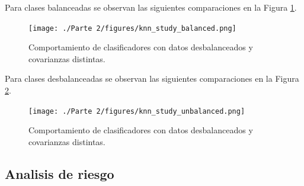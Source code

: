\documentclass[10pt]{article}
\begin{document}
Para clases balanceadas se observan las siguientes comparaciones en la Figura
\ref{fig:knn-study-balanced}.

\begin{figure}[ht]
    \centering
    \texttt{[image: ./Parte 2/figures/knn\_study\_balanced.png]}
    \caption{Comportamiento de clasificadores con datos desbalanceados y covarianzas distintas.}    
    \label{fig:knn-study-balanced}
\end{figure}

Para clases desbalanceadas se observan las siguientes comparaciones en la Figura
\ref{fig:knn-study-unbalanced}.

\begin{figure}[ht]
    \centering
    \texttt{[image: ./Parte 2/figures/knn\_study\_unbalanced.png]}
    \caption{Comportamiento de clasificadores con datos desbalanceados y covarianzas distintas.}    
    \label{fig:knn-study-unbalanced}
\end{figure}


\subsection*{Analisis de riesgo}
\end{document}
